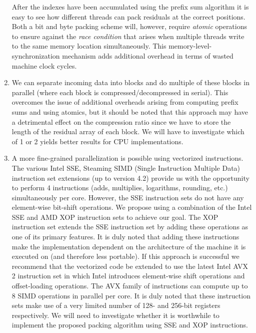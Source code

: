 \begin{enumerate}
 After the indexes have been accumulated using the prefix sum algorithm it is easy to see how different threads can pack residuals at the correct positions. Both a bit and byte
 packing scheme will, however, require \textit{atomic} operations to ensure against the \textit{race condition} that arises when multiple threads write to the same memory 
 location simultaneously. This memory-level-synchronization mechanism adds additional overhead in terms of wasted machine clock cycles.
 \item We can separate incoming data into blocks and do multiple of these blocks in parallel (where each block is compressed/decompressed in serial). This overcomes the issue of additional overheads arising
 from computing prefix sums and using atomics, but it should be noted that this approach may have a detrimental effect on the compression ratio since we have to store the length of the residual array of each block.
 We will have to investigate which of 1 or 2 yields better results for CPU implementations.
 \item A more fine-grained parallelization is possible using vectorized instructions. The various Intel SSE, Steaming SIMD (Single Instruction Multiple Data) instruction set extensions (up to version 4.2) provide
 us with the opportunity to perform 4 instructions (adds, multiplies, logarithms, rounding, etc.) simultaneously per core. However, the SSE instruction sets do not have any element-wise bit-shift operations. We propose 
 using a combination of the Intel SSE and AMD XOP instruction sets to achieve our goal. The XOP instruction set extends the SSE instruction set by adding these operations as one of its primary features. It is
 duly noted that adding these instructions make the implementation dependent on the architecture of the machine it is executed on (and therefore less portable). If this approach is successful we recommend 
 that the vectorized code be extended to use the latest Intel AVX 2 instruction set in which Intel introduces element-wise shift operations and offset-loading operations. The AVX family of instructions
 can compute up to 8 SIMD operations in parallel per core. It is duly noted that these instruction sets make use of a very limited number of 128- and 256-bit registers respectively. We will need to investigate
 whether it is worthwhile to implement the proposed packing algorithm using SSE and XOP instructions.
\end{enumerate}
